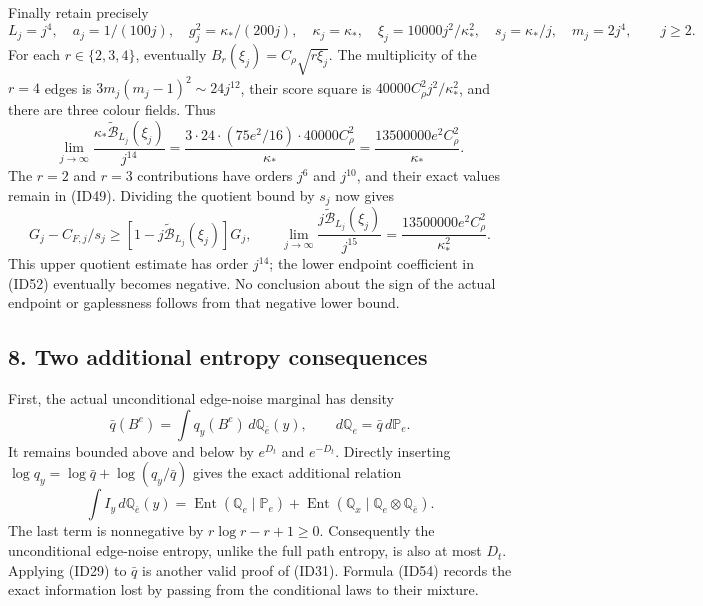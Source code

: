 \documentclass[11pt]{article}
\begin{document}
Finally retain precisely
\[
 L_j=j^4,\quad a_j=1/(100j),\quad g_j^2=\kappa_*/(200j),\quad
 \kappa_j=\kappa_*,\quad \xi_j=10000j^2/\kappa_*^2,\quad
 s_j=\kappa_*/j,\quad m_j=2j^4,\qquad j\ge2.
 \tag{ID50}
\]
For each \(r\in\{2,3,4\}\), eventually \(B_r(\xi_j)=C_\rho\sqrt{r\xi_j}\). The multiplicity of the \(r=4\) edges is \(3m_j(m_j-1)^2\sim24j^{12}\), their score square is \(40000C_\rho^2j^2/\kappa_*^2\), and there are three colour fields. Thus
\[
 \lim_{j\to\infty}\frac{\kappa_*\widetilde{\mathcal B}_{L_j}(\xi_j)}{j^{14}}
 =\frac{3\cdot24\cdot(75e^2/16)\cdot40000C_\rho^2}{\kappa_*}
 =\frac{13500000e^2C_\rho^2}{\kappa_*}.
 \tag{ID51}
\]
The \(r=2\) and \(r=3\) contributions have orders \(j^6\) and \(j^{10}\), and their exact values remain in (ID49). Dividing the quotient bound by \(s_j\) now gives
\[
 G_j-C_{F,j}/s_j\ge[1-j\widetilde{\mathcal B}_{L_j}(\xi_j)]G_j,\qquad
 \lim_{j\to\infty}\frac{j\widetilde{\mathcal B}_{L_j}(\xi_j)}{j^{15}}
 =\frac{13500000e^2C_\rho^2}{\kappa_*^2}.
 \tag{ID52}
\]
This upper quotient estimate has order \(j^{14}\); the lower endpoint coefficient in (ID52) eventually becomes negative. No conclusion about the sign of the actual endpoint or gaplessness follows from that negative lower bound.

\subsection*{8. Two additional entropy consequences}

First, the actual unconditional edge-noise marginal has density
\[
 \bar q(B^e)=\int q_y(B^e)\,d\mathbb Q_{\bar e}(y),\qquad
 d\mathbb Q_e=\bar q\,d\mathbb P_e.
 \tag{ID53}
\]
It remains bounded above and below by \(e^{D_t}\) and \(e^{-D_t}\). Directly inserting \(\log q_y=\log\bar q+\log(q_y/\bar q)\) gives the exact additional relation
\[
 \int I_y\,d\mathbb Q_{\bar e}(y)
 =\operatorname{Ent}(\mathbb Q_e\mid\mathbb P_e)
  +\operatorname{Ent}(\mathbb Q_x\mid\mathbb Q_e\otimes\mathbb Q_{\bar e}).
 \tag{ID54}
\]
The last term is nonnegative by \(r\log r-r+1\ge0\). Consequently the unconditional edge-noise entropy, unlike the full path entropy, is also at most \(D_t\). Applying (ID29) to \(\bar q\) is another valid proof of (ID31). Formula (ID54) records the exact information lost by passing from the conditional laws to their mixture.
\end{document}
